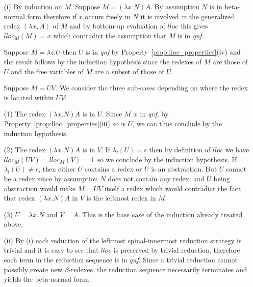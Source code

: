 \documentclass{elsarticle}
\theoremstyle{plain}
\theoremstyle{definition}
\begin{document}
\begin{compactitem}

\item[(i)]
By induction on $M$. Suppose $M = (\lambda x . N) A$. By assumption $N$ is in beta-normal form therefore if $x$ occurs freely in $N$ it is involved in the generalized redex $(\lambda x, A)$ of $M$ and by bottom-up evaluation of $lloc$ this gives $lloc_M(M) = x$ which contradict the assumption that $M$ is in \emph{qnf}.

Suppose $M = \lambda z . U$ then $U$ is in \emph{qnf} by Property~\ref{prop:lloc_properties}(iv) and the result follows by the induction hypothesis
since the redexes of $M$ are those of $U$ and the free variables of $M$ are a subset of those of $U$.

Suppose $M = U V$. We consider the three sub-cases depending on where the redex is located within $U V$:
\begin{compactitem}
  \item[(1)] The redex $(\lambda x . N) A$  is in $U$. Since $M$ is in \emph{qnf}, by Property~\ref{prop:lloc_properties}(iii) so is $U$, we can thus conclude by the induction hypothesis.

  \item[(2)] The redex $(\lambda x . N) A$  is in $V$.
If $\lambda_l(U) = \epsilon$ then by definition of $lloc$ we have $lloc_M(UV) = lloc_M(V) = \bot$ so we conclude by the induction hypothesis.
If $\lambda_l(U) \neq \epsilon$, then either $U$ contains a redex or $U$ is an abstraction. But $U$ cannot be a redex since by assumption $N$ does not contain any redex, and $U$ being abstraction would make $M = U V$ itself a redex which would contradict the fact that redex $(\lambda x . N) A$ in $V$ is the leftmost redex in $M$.

  \item[(3)] $U = \lambda x . N$ and $V = A$. This is the base case of the induction already treated above.
\end{compactitem}

\item[(ii)]
By (i) each reduction of the leftmost spinal-innermost reduction strategy is trivial and it is easy to see that $lloc$ is preserved by trivial reduction, therefore each term in the reduction sequence is in \emph{qnf}.
Since a trivial reduction cannot possibly create new $\beta$-redexes, the reduction sequence necessarily terminates and yields the beta-normal form.
\end{compactitem}
\end{document}
